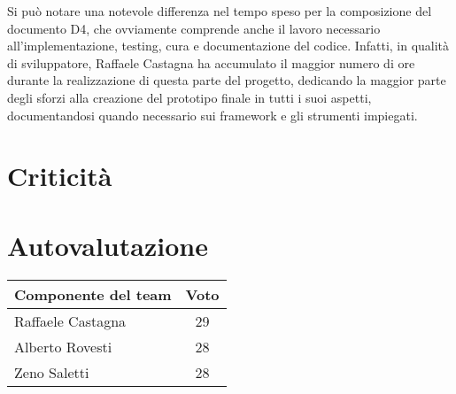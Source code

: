 \documentclass[11pt, a4paper]{article}
\theoremstyle{definition}
\begin{document}
Si può notare una notevole differenza nel tempo speso per la composizione
del documento D4, che ovviamente comprende anche il lavoro necessario all'implementazione,
testing, cura e documentazione del codice. Infatti, in qualità di sviluppatore,
Raffaele Castagna ha accumulato il maggior numero di ore durante la realizzazione
di questa parte del progetto, dedicando la maggior parte degli sforzi alla
creazione del prototipo finale in tutti i suoi aspetti, documentandosi quando
necessario sui framework e gli strumenti impiegati.

\section{Criticità}




\section{Autovalutazione}
\begin{center}
    \begin{tabularx}{0.5\textwidth}{|X||c|}
        \hline
        \cellcolor{red!70}Componente del team & \cellcolor{red!70}Voto\\
        \hline
        Raffaele Castagna & 29\\
        \hline
        Alberto Rovesti & 28\\
        \hline
        Zeno Saletti & 28\\
        \hline
    \end{tabularx}
\end{center}
\end{document}
